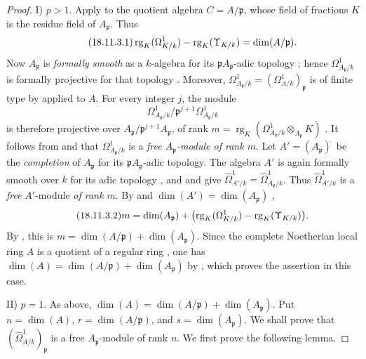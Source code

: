 \begin{proof}
I) $p>1$. Apply  to the quotient algebra $C=A/\mathfrak{p}$, whose field of fractions $K$ is the residue field of $A_{\mathfrak{p}}$. Thus
\begin{equation}
\label{IV.18.11.3.1}
\tag{18.11.3.1}
  \operatorname{rg}_{K}(\Omega^1_{K/k})-
  \operatorname{rg}_{K}(\Upsilon_{K/k})=\dim(A/\mathfrak{p}).
\end{equation}
Now $A_{\mathfrak{p}}$ is \emph{formally smooth} as a $k$-algebra for its $\mathfrak{p}A_{\mathfrak{p}}$-adic topology ; hence $\Omega^1_{A_{\mathfrak{p}}/k}$ is formally projective  for that topology . Moreover,
$\Omega^1_{A_{\mathfrak{p}}/k}=(\Omega^1_{A/k})_{\mathfrak{p}}$  is of finite type by  applied to $A$. For every integer $j$, the module
\[
  \Omega^1_{A_{\mathfrak{p}}/k}/\mathfrak{p}^{j+1}\Omega^1_{A_{\mathfrak{p}}/k}
\]
is therefore projective over $A_{\mathfrak{p}}/\mathfrak{p}^{j+1}A_{\mathfrak{p}}$, of rank
$m=\operatorname{rg}_{K}(\Omega^1_{A_{\mathfrak{p}}/k}\otimes_{A_{\mathfrak{p}}}K)$ . It follows from  and  that $\Omega^1_{A_{\mathfrak{p}}/k}$ is a \emph{free $A_{\mathfrak{p}}$-module of rank $m$}. Let $A'=(A_{\mathfrak{p}})^{{\widehat{\,}}}$ be the \emph{completion} of $A_{\mathfrak{p}}$ for its $\mathfrak{p}A_{\mathfrak{p}}$-adic topology. The algebra $A'$ is again formally smooth over $k$ for its adic topology , and  and  give $\hat{\Omega}^1_{A'/k}=\hat{\Omega}^1_{A_{\mathfrak{p}}/k}$. Thus $\hat{\Omega}^1_{A'/k}$ is a \emph{free} $A'$-module \emph{of rank $m$}. By  and $\dim(A')=\dim(A_{\mathfrak{p}})$ ,
\begin{equation}
\label{IV.18.11.3.2}
\tag{18.11.3.2}
  m=\dim(A_{\mathfrak{p}})+
  \bigl(\operatorname{rg}_{K}(\Omega^1_{K/k})-
  \operatorname{rg}_{K}(\Upsilon_{K/k})\bigr).
\end{equation}
By , this is $m=\dim(A/\mathfrak{p})+\dim(A_{\mathfrak{p}})$. Since the complete Noetherian local ring $A$ is a quotient of a regular ring , one has
$\dim(A)=\dim(A/\mathfrak{p})+\dim(A_{\mathfrak{p}})$ by , which proves the assertion in this case.

II) $p=1$. As above, $\dim(A)=\dim(A/\mathfrak{p})+\dim(A_{\mathfrak{p}})$. Put $n=\dim(A)$, $r=\dim(A/\mathfrak{p})$, and $s=\dim(A_{\mathfrak{p}})$. We shall prove that $(\hat{\Omega}^1_{A/k})_{\mathfrak{p}}$ is a free $A_{\mathfrak{p}}$-module of rank $n$. We first prove the following lemma.


\end{proof}
